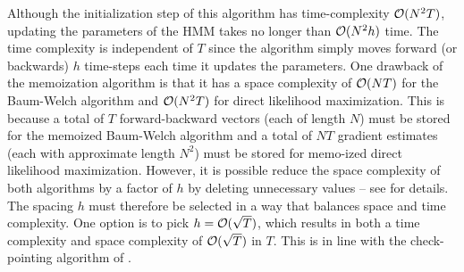 Although the initialization step of this algorithm has time-complexity $\mathcal{O}(N^2T)$, updating the parameters of the HMM takes no longer than $\mathcal{O}(N^2h)$ time. The time complexity is independent of $T$ since the algorithm simply moves forward (or backwards) $h$ time-steps each time it updates the parameters. One drawback of the memoization algorithm is that it has a space complexity of $\mathcal{O}(NT)$ for the Baum-Welch algorithm and $\mathcal{O}(N^2T)$ for direct likelihood maximization. This is because a total of $T$ forward-backward vectors (each of length $N$) must be stored for the memoized Baum-Welch algorithm and a total of $NT$ gradient estimates (each with approximate length $N^2$) must be stored for memo-ized direct likelihood maximization. However, it is possible reduce the space complexity of both algorithms by a factor of $h$ by deleting unnecessary values -- see \citet{Florez:2005} for details. The spacing $h$ must therefore be selected in a way that balances space and time complexity. One option is to pick $h = \mathcal{O}(\sqrt{T})$, which results in both a time complexity and space complexity of $\mathcal{O}(\sqrt{T})$ in $T$. This is in line with the check-pointing algorithm of \citet{Grice:1997}.